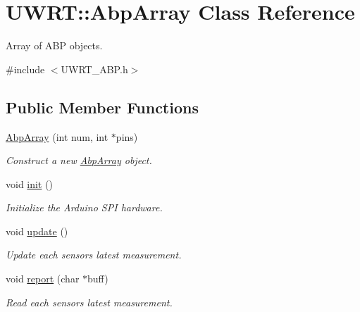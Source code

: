 \hypertarget{classUWRT_1_1AbpArray}{}\section{U\+W\+RT\+:\+:Abp\+Array Class Reference}
\label{classUWRT_1_1AbpArray}


Array of A\+BP objects.  




{\ttfamily \#include $<$U\+W\+R\+T\+\_\+\+A\+B\+P.\+h$>$}

\subsection*{Public Member Functions}
\begin{DoxyCompactItemize}
\item 
\hyperlink{classUWRT_1_1AbpArray_a3cfefe21f4052fd4ce99448a00e28bcf}{Abp\+Array} (int num, int $\ast$pins)
\begin{DoxyCompactList}\small\item\em Construct a new \hyperlink{classUWRT_1_1AbpArray}{Abp\+Array} object. \end{DoxyCompactList}\item 
void \hyperlink{classUWRT_1_1AbpArray_a362852eb7db6909f9aaf5177d4f77bdb}{init} ()\hypertarget{classUWRT_1_1AbpArray_a362852eb7db6909f9aaf5177d4f77bdb}{}\label{classUWRT_1_1AbpArray_a362852eb7db6909f9aaf5177d4f77bdb}

\begin{DoxyCompactList}\small\item\em Initialize the Arduino S\+PI hardware. \end{DoxyCompactList}\item 
void \hyperlink{classUWRT_1_1AbpArray_aa5e62613fc51b379fec332d0dcdf5880}{update} ()\hypertarget{classUWRT_1_1AbpArray_aa5e62613fc51b379fec332d0dcdf5880}{}\label{classUWRT_1_1AbpArray_aa5e62613fc51b379fec332d0dcdf5880}

\begin{DoxyCompactList}\small\item\em Update each sensor\textquotesingle{}s latest measurement. \end{DoxyCompactList}\item 
void \hyperlink{classUWRT_1_1AbpArray_a83d1762b96a0d099707e1c6dae1b74fd}{report} (char $\ast$buff)
\begin{DoxyCompactList}\small\item\em Read each sensors latest measurement. \end{DoxyCompactList}\end{DoxyCompactItemize}


